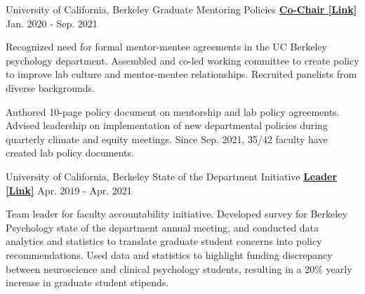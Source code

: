 


\begin{cventries}

  \cventry 
    {University of California, Berkeley} %
    {Graduate Mentoring Policies}
    {\href{http://ivrylab.berkeley.edu/uploads/4/1/1/5/41152143/cognac_lab_policies_19feb2021.pdf}{\textbf{Co-Chair [Link]}}} %
    {Jan. 2020 - Sep. 2021} %
    {
      \begin{cvitems} %
        \item {Recognized need for formal mentor-mentee agreements in the UC Berkeley psychology department. Assembled and co-led working committee to create policy to improve lab culture and mentor-mentee relationships. Recruited panelists from diverse backgrounds.}
        \item {Authored 10-page policy document on mentorship and lab policy agreements. Advised leadership on implementation of new departmental policies during quarterly climate and equity meetings. Since Sep. 2021, 35/42 faculty have created lab policy documents.}
      \end{cvitems}
    }
    
  \cventry 
    {University of California, Berkeley} %
    {State of the Department Initiative}
    {\href{https://drive.google.com/file/d/1wD7y5gW39EU4vQUyhcrO7Fra1Ttc_HyG/view?usp=sharing}{\textbf{Leader [Link]}}} %
    {Apr. 2019 - Apr. 2021} %
    {
      \begin{cvitems} %
      	\item {Team leader for faculty accountability initiative. Developed survey for Berkeley Psychology state of the department annual meeting, and conducted data analytics and statistics to translate graduate student concerns into policy recommendations. Used data and statistics to highlight funding discrepancy between neuroscience and clinical psychology students, resulting in a 20\% yearly increase in graduate student stipends.}
      \end{cvitems}
    }
  

\end{cventries}
